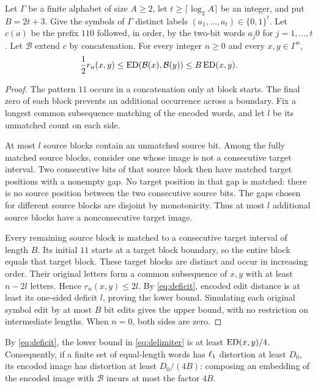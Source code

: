 \begin{lemma}\label{lem:delimiter}
Let $\Gamma$ be a finite alphabet of size $A\geq2$, let
$t\geq\lceil\log_2A\rceil$ be an integer, and put $B=2t+3$.
Give the symbols of $\Gamma$ distinct
labels $(a_1,\ldots,a_t)\in\{0,1\}^t$. Let $c(a)$ be the prefix
$110$ followed, in order, by the two-bit words $a_j0$ for
$j=1,\ldots,t$.
Let $\mathcal B$ extend $c$ by concatenation. For every integer
$n\geq0$ and every $x,y\in\Gamma^n$,
\begin{equation}\label{eq:delimiter}
 \frac12r_n(x,y)
 \leq\operatorname{ED}(\mathcal B(x),\mathcal B(y))
 \leq B\operatorname{ED}(x,y).
\end{equation}
\end{lemma}
\begin{proof}
The pattern $11$ occurs in a concatenation only at block starts.
The final zero of each block prevents an additional occurrence across
a boundary. Fix a longest
common subsequence matching of the encoded words, and let $l$ be its
unmatched count on each side.

At most $l$ source blocks contain an unmatched source bit. Among
the fully matched source blocks, consider one whose image is not a
consecutive target interval. Two consecutive bits of that source
block then have matched target positions with a nonempty gap. No target
position in that gap is matched: there is no source position between
the two consecutive source bits. The gaps chosen for different source
blocks are disjoint by monotonicity. Thus at most $l$ additional
source blocks have a nonconsecutive target image.

Every remaining source block is matched to a consecutive target
interval of length $B$. Its initial $11$ starts at a target block
boundary, so the entire block equals that target block. These target
blocks are distinct and occur in increasing order. Their original
letters form a common subsequence of $x,y$ with at least $n-2l$
letters. Hence $r_n(x,y)\leq2l$. By \eqref{eq:deficit}, encoded edit
distance is at least its one-sided deficit $l$, proving the lower
bound. Simulating each original symbol edit by at most $B$ bit edits
gives the upper bound, with no restriction on intermediate lengths.
When $n=0$, both sides are zero.
\end{proof}

By \eqref{eq:deficit}, the lower bound in \eqref{eq:delimiter} is at
least $\operatorname{ED}(x,y)/4$. Consequently, if a finite set of equal-length
words has $\ell_1$ distortion at least $D_0$, its encoded image has
distortion at least $D_0/(4B)$: composing an embedding of the encoded
image with $\mathcal B$ incurs at most the factor $4B$.
